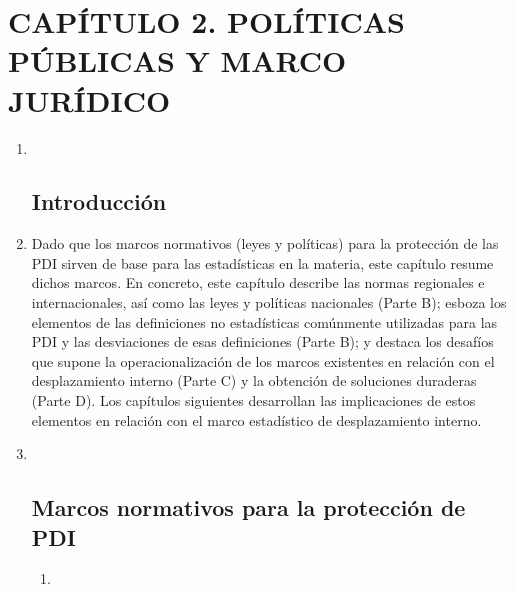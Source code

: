 \documentclass[
]{book}
\begin{document}
\hypertarget{capuxedtulo-2.-poluxedticas-puxfablicas-y-marco-juruxeddico}{%
\chapter{CAPÍTULO 2. POLÍTICAS PÚBLICAS Y MARCO JURÍDICO}\label{capuxedtulo-2.-poluxedticas-puxfablicas-y-marco-juruxeddico}}

\begin{enumerate}
\def\labelenumi{\arabic{enumi}.}
\item ~
  \hypertarget{introducciuxf3n}{%
  \section{Introducción}\label{introducciuxf3n}}
\item
  Dado que los marcos normativos (leyes y políticas) para la protección de las PDI sirven de base para las estadísticas en la materia, este capítulo resume dichos marcos. En concreto, este capítulo describe las normas regionales e internacionales, así como las leyes y políticas nacionales (Parte B); esboza los elementos de las definiciones no estadísticas comúnmente utilizadas para las PDI y las desviaciones de esas definiciones (Parte B); y destaca los desafíos que supone la operacionalización de los marcos existentes en relación con el desplazamiento interno (Parte C) y la obtención de soluciones duraderas (Parte D). Los capítulos siguientes desarrollan las implicaciones de estos elementos en relación con el marco estadístico de desplazamiento interno.
\item ~
  \hypertarget{marcos-normativos-para-la-protecciuxf3n-de-pdi}{%
  \section{Marcos normativos para la protección de PDI}\label{marcos-normativos-para-la-protecciuxf3n-de-pdi}}

  \begin{enumerate}
  \def\labelenumii{\arabic{enumii}.}
  \item ~
    \hypertarget{marco-internacional}{%
}
\end{enumerate}
\end{enumerate}
\end{document}
